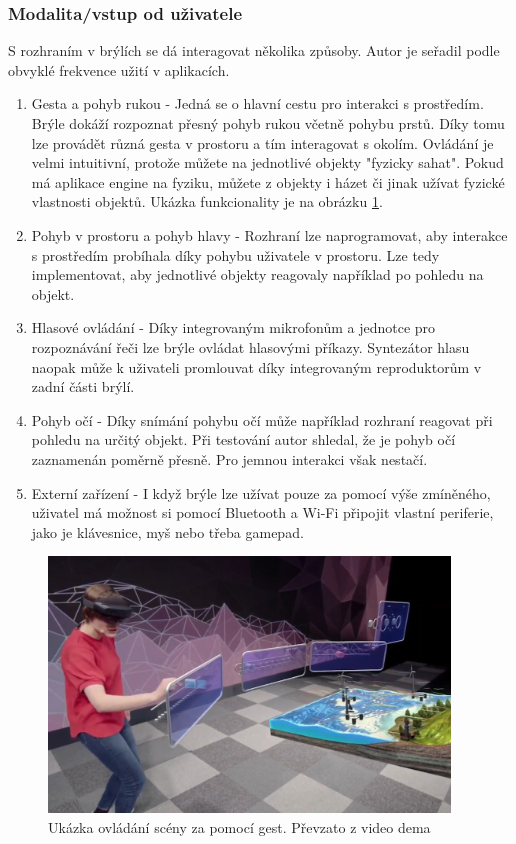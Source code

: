 \subsubsection{Modalita/vstup od uživatele}
S rozhraním v brýlích se dá interagovat několika způsoby. Autor je seřadil podle obvyklé frekvence užití v aplikacích.
\begin{enumerate}
    \item Gesta a pohyb rukou - Jedná se o hlavní cestu pro interakci s prostředím. Brýle dokáží rozpoznat přesný pohyb rukou včetně pohybu prstů. Díky tomu lze provádět různá gesta v prostoru a tím interagovat s okolím. Ovládání je velmi intuitivní, protože můžete na jednotlivé objekty "fyzicky sahat". Pokud má aplikace engine na fyziku, můžete z objekty i házet či jinak užívat fyzické vlastnosti objektů. Ukázka funkcionality je na obrázku \ref{pic:hololens2Demo}.
   \item Pohyb v prostoru a pohyb hlavy - Rozhraní lze naprogramovat, aby interakce s prostředím probíhala díky pohybu uživatele v prostoru. Lze tedy implementovat, aby jednotlivé objekty reagovaly například po pohledu na objekt. 
    \item Hlasové ovládání - Díky integrovaným mikrofonům a jednotce pro rozpoznávání řeči lze brýle ovládat hlasovými příkazy. Syntezátor hlasu naopak může k uživateli promlouvat díky integrovaným reproduktorům v zadní části brýlí.
    \item Pohyb očí - Díky snímání pohybu očí může například rozhraní reagovat při pohledu na určitý objekt. Při testování autor shledal, že je pohyb očí zaznamenán poměrně přesně. Pro jemnou interakci však nestačí.
 
    \item Externí zařízení - I když brýle lze užívat pouze za pomocí výše zmíněného, uživatel má možnost si pomocí Bluetooth a Wi-Fi připojit vlastní periferie, jako je klávesnice, myš nebo třeba gamepad. 
\end{enumerate}
\begin{figure}[ht] 
	\centering
	\includegraphics[width=0.95\textwidth]{obrazky-figures/ar/hololensDemo.png}
	\caption{Ukázka ovládání scény za pomocí gest. Převzato z video dema \cite{hololens2videoDemo}}
	\label{pic:hololens2Demo}
\end{figure}

